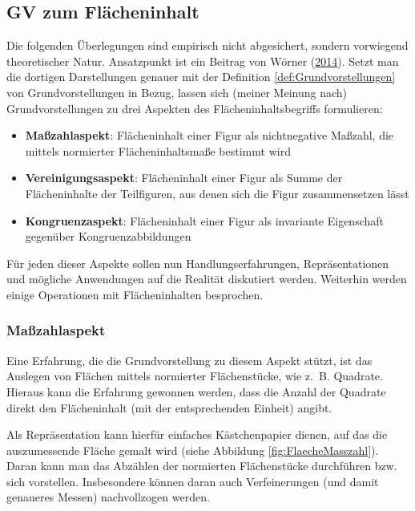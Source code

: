 \documentclass[
]{scrbook}
\providecommand{\tightlist}{%
  \setlength{\itemsep}{0pt}\setlength{\parskip}{0pt}}
\theoremstyle{definition}
\theoremstyle{definition}
\theoremstyle{definition}
\theoremstyle{definition}
\theoremstyle{remark}
\begin{document}
\hypertarget{gv-zum-fluxe4cheninhalt}{%
\subsection{GV zum Flächeninhalt}\label{gv-zum-fluxe4cheninhalt}}

Die folgenden Überlegungen sind empirisch nicht abgesichert, sondern vorwiegend theoretischer Natur. Ansatzpunkt ist ein Beitrag von Wörner (\protect\hyperlink{ref-Worner2014}{2014}). Setzt man die dortigen Darstellungen genauer mit der Definition \ref{def:Grundvorstellungen} von Grundvorstellungen in Bezug, lassen sich (meiner Meinung nach) Grundvorstellungen zu drei Aspekten des Flächeninhaltsbegriffs formulieren:

\begin{itemize}
\tightlist
\item
  \textbf{Maßzahlaspekt}: Flächeninhalt einer Figur als nichtnegative Maßzahl, die mittels normierter Flächeninhaltsmaße bestimmt wird
\item
  \textbf{Vereinigungsaspekt}: Flächeninhalt einer Figur als Summe der Flächeninhalte der Teilfiguren, aus denen sich die Figur zusammensetzen lässt
\item
  \textbf{Kongruenzaspekt}: Flächeninhalt einer Figur als invariante Eigenschaft gegenüber Kongruenzabbildungen
\end{itemize}

Für jeden dieser Aspekte sollen nun Handlungserfahrungen, Repräsentationen und mögliche Anwendungen auf die Realität diskutiert werden. Weiterhin werden einige Operationen mit Flächeninhalten besprochen.

\hypertarget{mauxdfzahlaspekt}{%
\subsubsection{Maßzahlaspekt}\label{mauxdfzahlaspekt}}

Eine Erfahrung, die die Grundvorstellung zu diesem Aspekt stützt, ist das Auslegen von Flächen mittels normierter Flächenstücke, wie z.~B. Quadrate. Hieraus kann die Erfahrung gewonnen werden, dass die Anzahl der Quadrate direkt den Flächeninhalt (mit der entsprechenden Einheit) angibt.

Als Repräsentation kann hierfür einfaches Kästchenpapier dienen, auf das die auszumessende Fläche gemalt wird (siehe Abbildung \ref{fig:FlaecheMasszahl}). Daran kann man das Abzählen der normierten Flächenstücke durchführen bzw. sich vorstellen. Insbesondere können daran auch Verfeinerungen (und damit genaueres Messen) nachvollzogen werden.
\end{document}
